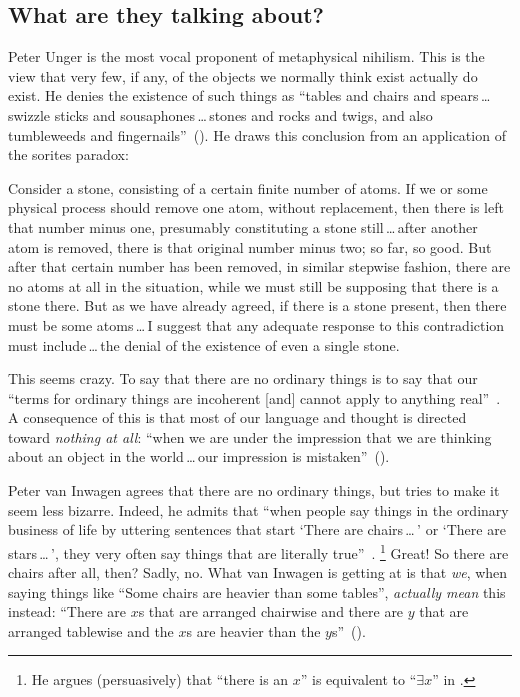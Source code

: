 \subsection{What are they talking about?}
Peter Unger is the most vocal proponent of metaphysical nihilism. This is the view that very few, if any, of the objects we normally think exist actually do exist. He denies the existence of such things as ``tables and chairs and spears\,\ldots\,swizzle sticks and sousaphones\,\ldots\,stones and rocks and twigs, and also tumbleweeds and fingernails''~(\citeyear[117]{unger1979}). He draws this conclusion from an application of the sorites paradox:
\begin{squote}
Consider a stone, consisting of a certain finite number of atoms. If we or some physical process should remove one atom, without replacement, then there is left that number minus one, presumably constituting a stone still\,\ldots\,after another atom is removed, there is that original number minus two; so far, so good. But after that certain number has been removed, in similar stepwise fashion, there are no atoms at all in the situation, while we must still be supposing that there is a stone there. But as we have already agreed, if there is a stone present, then there must
be some atoms\,\ldots\,I suggest that any adequate response to this contradiction must include\,\ldots\,the denial of the existence of even a single stone.~\citep[121--122]{unger1979}
\end{squote}
This seems crazy. To say that there are no ordinary things is to say that our ``terms for ordinary things are incoherent [and] cannot apply to anything real''~\citep[147]{unger1979}. A consequence of this is that most of our language and thought is directed toward {\em nothing at all}: ``when we are under the impression that we are thinking about an object in the world\,\ldots\,our impression is mistaken''~(\citeyear[149]{unger1979}).

Peter van Inwagen agrees that there are no ordinary things, but tries to make it seem less bizarre. Indeed, he admits that ``when people say things in the ordinary business of life by uttering sentences that start `There are chairs\,\ldots\,' or `There are stars\,\ldots\,', they very often say things that are literally true''~\cite[102]{inwagen1995}.%
%
\footnote{He argues (persuasively) that ``there is an $x$'' is equivalent to ``$\exists x$'' in \citet{inwagen1998}.} %
%
Great! So there are chairs after all, then? Sadly, no. What van Inwagen is getting at is that {\em we}, when saying things like ``Some chairs are heavier than some tables'', {\em actually mean} this instead: ``There are $x$s that are arranged chairwise and there are $y$ that are arranged tablewise and the $x$s are heavier than the $y$s''~(\citeyear[109]{inwagen1995}).

